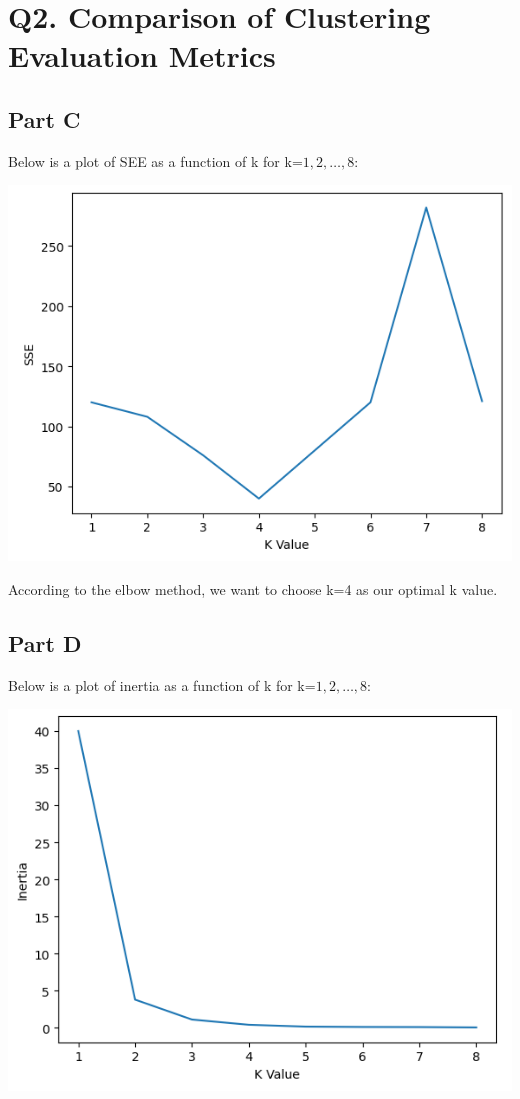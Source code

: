 \documentclass{article}
\begin{document}
\section*{Q2. Comparison of Clustering Evaluation Metrics}

\subsection*{Part C}
Below is a plot of SEE as a function of k for k=$1,2,\dots,8$:

\includegraphics{Images/Screenshot 2024-03-17 164753.png}

According to the elbow method, we want to choose k=4 as our optimal k value.

\subsection*{Part D}
Below is a plot of inertia as a function of k for k=$1,2,\dots,8$:

\includegraphics{Images/Screenshot 2024-03-17 165102.png}
\end{document}
